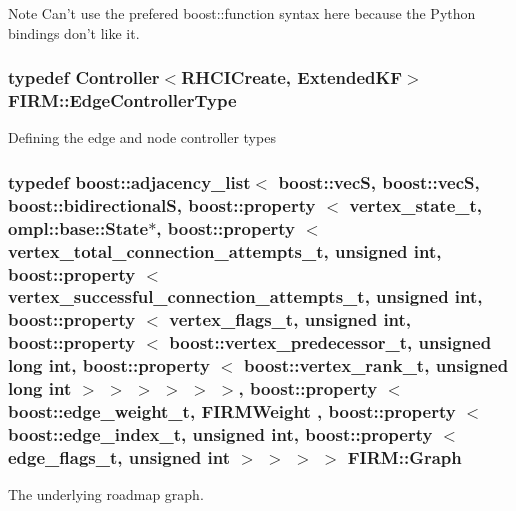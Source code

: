 \begin{DoxyNote}{\-Note}
\-Can't use the prefered boost\-::function syntax here because the \-Python bindings don't like it. 
\end{DoxyNote}
\hypertarget{class_f_i_r_m_a70abcb24fbc9f836b94119f65c8f8a37}{
\subsubsection[{\-Edge\-Controller\-Type}]{\setlength{\rightskip}{0pt plus 5cm}typedef {\bf \-Controller}$<${\bf \-R\-H\-C\-I\-Create}, {\bf \-Extended\-K\-F}$>$ {\bf \-F\-I\-R\-M\-::\-Edge\-Controller\-Type}}}\label{class_f_i_r_m_a70abcb24fbc9f836b94119f65c8f8a37}
\-Defining the edge and node controller types \hypertarget{class_f_i_r_m_a687e9f4243b22c30ee1fa5da22a85053}{
\subsubsection[{\-Graph}]{\setlength{\rightskip}{0pt plus 5cm}typedef boost\-::adjacency\-\_\-list$<$ boost\-::vec\-S, boost\-::vec\-S, boost\-::bidirectional\-S, boost\-::property $<$ {\bf vertex\-\_\-state\-\_\-t}, ompl\-::base\-::\-State$\ast$, boost\-::property $<$ {\bf vertex\-\_\-total\-\_\-connection\-\_\-attempts\-\_\-t}, unsigned int, boost\-::property $<$ {\bf vertex\-\_\-successful\-\_\-connection\-\_\-attempts\-\_\-t}, unsigned int, boost\-::property $<$ {\bf vertex\-\_\-flags\-\_\-t}, unsigned int, boost\-::property $<$ boost\-::vertex\-\_\-predecessor\-\_\-t, unsigned long int, boost\-::property $<$ boost\-::vertex\-\_\-rank\-\_\-t, unsigned long int $>$ $>$ $>$ $>$ $>$ $>$, boost\-::property $<$ boost\-::edge\-\_\-weight\-\_\-t, {\bf \-F\-I\-R\-M\-Weight} , boost\-::property $<$ boost\-::edge\-\_\-index\-\_\-t, unsigned int, boost\-::property $<$ {\bf edge\-\_\-flags\-\_\-t}, unsigned int $>$ $>$ $>$ $>$ {\bf \-F\-I\-R\-M\-::\-Graph}}}\label{class_f_i_r_m_a687e9f4243b22c30ee1fa5da22a85053}


\-The underlying roadmap graph. 

